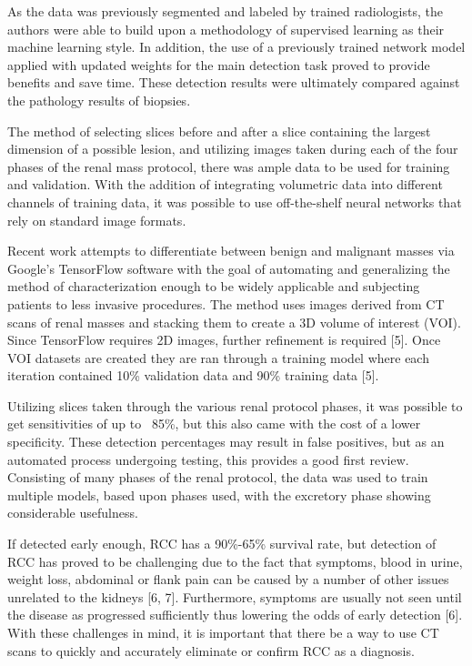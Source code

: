 \documentclass[10pt,journal,compsoc]{IEEEtran}
\begin{document}
As the data was previously segmented and labeled by trained radiologists, the authors were able to build upon a methodology of supervised learning as their machine learning style. In addition, the use of a previously trained network model applied with updated weights for the main detection task proved to provide benefits and save time. These detection results were ultimately compared against the pathology results of biopsies.


The method of selecting slices before and after a slice containing the largest dimension of a possible lesion, and utilizing images taken during each of the four phases of the renal mass protocol, there was ample data to be used for training and validation. With the addition of integrating volumetric data into different channels of training data, it was possible to use off-the-shelf neural networks that rely on standard image formats. 


Recent work attempts to differentiate between benign and malignant masses via Google’s TensorFlow software with the goal of automating and generalizing the method of characterization enough to be widely applicable and subjecting patients to less invasive procedures.   The method uses images derived from CT scans of renal masses and stacking them to create a 3D volume of interest (VOI).  Since TensorFlow requires 2D images, further refinement is required [5]. Once VOI datasets are created they are ran through a training model where each iteration contained 10\% validation data and 90\% training data [5].  

Utilizing slices taken through the various renal protocol phases, it was possible to get sensitivities of up to ~85\%, but this also came with the cost of a lower specificity. These detection percentages may result in false positives, but as an automated process undergoing testing, this provides a good first review.  Consisting of many phases of the renal protocol, the data was used to train multiple models, based upon phases used, with the excretory phase showing considerable usefulness. 


If detected early enough, RCC has a 90\%-65\% survival rate, but detection of RCC has proved to be challenging due to the fact that symptoms, blood in urine, weight loss, abdominal or flank pain can be caused by a number of other issues unrelated to the kidneys [6, 7]. Furthermore, symptoms are usually not seen until the disease as progressed sufficiently thus lowering the odds of early detection [6].  With these challenges in mind, it is important that there be a way to use CT scans to quickly and accurately eliminate or confirm RCC as a diagnosis.  
\end{document}
